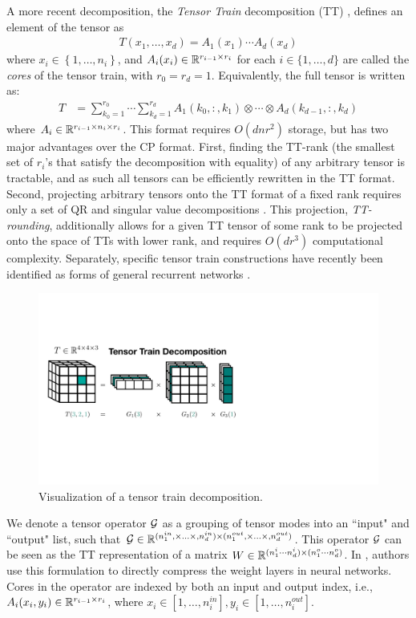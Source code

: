 A more recent decomposition, the \textit{Tensor Train} decomposition (TT) \citep{oseledets2011tensor}, defines an element of the tensor as
\begin{align}
T(x_1,\ldots,x_d) = A_1(x_1)\cdots A_d(x_d)
\end{align}
where $x_i \in \left\{1,\ldots, n_i\right\}$, and $A_i(x_i) \in \mathbb{R}^{r_{i-1} \times r_{i}}$ for each $i \in \{1,\ldots,d\}$ are called the \textit{cores} of the tensor train, with $r_0 = r_d = 1$. Equivalently, the full tensor is written as:
\begin{align}\label{eq:fullTT}
	T &= \sum_{k_0 = 1}^{r_0} \cdots \sum_{k_d = 1}^{r_d} A_1(k_0,:,k_1) \otimes \cdots \otimes A_d(k_{d-1},:,k_d) 
\end{align}
where $A_i \in \mathbb{R}^{r_{i-1}\times n_i \times r_i} $. 
This format requires $O(dnr^2)$ storage, but has two major advantages over the CP format. First, finding the TT-rank (the smallest set of $r_i$'s that satisfy the decomposition with equality) of any arbitrary tensor is tractable, and as such all tensors can be efficiently rewritten in the TT format. Second, projecting arbitrary tensors onto the TT format of a fixed rank requires only a set of QR and singular value decompositions \citep{oseledets2011tensor}. This projection, \textit{TT-rounding}, additionally allows for a given TT tensor of some rank to be projected onto the space of TTs with lower rank, and requires $O(dr^3)$ computational complexity. Separately, specific tensor train constructions have recently been identified as forms of general recurrent networks \citep{khrulkov2018generalized}.
\begin{figure}
	\centering
	\includegraphics[width=\textwidth,trim={0 12cm 25cm 10cm},clip]{2_bknd/ttdecomp.pdf}
	\caption[Tensor train decomposition]{\label{fig:ttdecomp} Visualization of a tensor train decomposition.}
\end{figure}
We denote a tensor operator $\mathcal{G}$ as a grouping of tensor modes into an ``input" and ``output" list, such that $\mathcal{G} \in \mathbb{R}^{(n_1^{in},\times\ldots\times,n_d^{in}) \times (n_1^{out},\times\ldots\times,n_d^{out})}$. This operator $\mathcal{G}$ can be seen as the TT representation of a matrix $W \in \mathbb{R}^{(n_1^i\cdots n_d^i) \times (n_1^o\cdots n_d^o)}$. In \cite{novikov2015tensorizing}, authors use this formulation to directly compress the weight layers in neural networks. Cores in the operator are indexed by both an input and output index, i.e., $A_i(x_i,y_i) \in \mathbb{R}^{r_{i-1}\times r_i}$, where $x_i \in [1,\ldots,n_i^{in}], y_i \in [1,\ldots,n_i^{out}]$.

